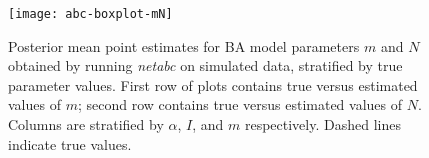 \clearpage

\begin{figure}
    \texttt{[image: abc-boxplot-mN]}
    \caption[
        Posterior mean point estimates for BA model parameters $m$ and $N$
        obtained by running \textit{netabc} on simulated data, stratified by
        true parameter values.
    ]{
        Posterior mean point estimates for BA model parameters $m$ and $N$
        obtained by running \textit{netabc} on simulated data, stratified by
        true parameter values. First row of plots contains true versus
        estimated values of $m$; second row contains true versus estimated
        values of $N$. Columns are stratified by $\alpha$, $I$, and $m$
        respectively. Dashed lines indicate true values. 
    }
    \label{fig:abcpt2}
\end{figure}

%

